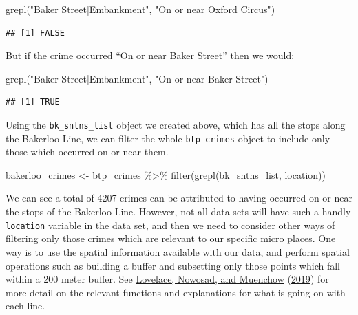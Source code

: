 \documentclass[
  krantz2]{krantz}
\makeatletter
\newenvironment{Shaded}{\begin{snugshade}}{\end{snugshade}}
\newcommand{\FunctionTok}[1]{\textcolor[rgb]{0,0,0}{#1}}
\newcommand{\NormalTok}[1]{#1}
\newcommand{\OtherTok}[1]{\textcolor[rgb]{0.37,0.37,0.37}{#1}}
\newcommand{\SpecialCharTok}[1]{\textcolor[rgb]{0,0,0}{#1}}
\newcommand{\StringTok}[1]{\textcolor[rgb]{0.5,0.5,0.5}{#1}}
\newenvironment{kframe}{%
\medskip{}
\setlength{\fboxsep}{.8em}
 \def\at@end@of@kframe{}%
 \ifinner\ifhmode%
  \def\at@end@of@kframe{\end{minipage}}%
  \begin{minipage}{\columnwidth}%
 \fi\fi%
 \def\FrameCommand##1{\hskip\@totalleftmargin \hskip-\fboxsep
 \colorbox{shadecolor}{##1}\hskip-\fboxsep
     \hskip-\linewidth \hskip-\@totalleftmargin \hskip\columnwidth}%
 \MakeFramed {\advance\hsize-\width
   \@totalleftmargin\z@ \linewidth\hsize
   \@setminipage}}%
 {\par\unskip\endMakeFramed%
 \at@end@of@kframe}
\renewenvironment{Shaded}{\begin{kframe}}{\end{kframe}}
\makeatother
\begin{document}
\begin{Shaded}
\begin{Highlighting}[]
\FunctionTok{grepl}\NormalTok{(}\StringTok{"Baker Street|Embankment"}\NormalTok{, }\StringTok{"On or near Oxford Circus"}\NormalTok{)}
\end{Highlighting}
\end{Shaded}

\begin{verbatim}
## [1] FALSE
\end{verbatim}

But if the crime occurred ``On or near Baker Street'' then we would:

\begin{Shaded}
\begin{Highlighting}[]
\FunctionTok{grepl}\NormalTok{(}\StringTok{"Baker Street|Embankment"}\NormalTok{, }\StringTok{"On or near Baker Street"}\NormalTok{)}
\end{Highlighting}
\end{Shaded}

\begin{verbatim}
## [1] TRUE
\end{verbatim}

Using the \texttt{bk\_sntns\_list} object we created above, which has all the stops along the Bakerloo Line, we can filter the whole \texttt{btp\_crimes} object to include only those which occurred on or near them.

\begin{Shaded}
\begin{Highlighting}[]
\NormalTok{bakerloo\_crimes }\OtherTok{\textless{}{-}}\NormalTok{ btp\_crimes }\SpecialCharTok{\%\textgreater{}\%} 
  \FunctionTok{filter}\NormalTok{(}\FunctionTok{grepl}\NormalTok{(bk\_sntns\_list, location))}
\end{Highlighting}
\end{Shaded}

We can see a total of 4207 crimes can be attributed to having occurred on or near the stops of the Bakerloo Line. However, not all data sets will have such a handly \texttt{location} variable in the data set, and then we need to consider other ways of filtering only those crimes which are relevant to our specific micro places. One way is to use the spatial information available with our data, and perform spatial operations such as building a buffer and subsetting only those points which fall within a 200 meter buffer. See \protect\hyperlink{ref-Lovelace_2019}{Lovelace, Nowosad, and Muenchow} (\protect\hyperlink{ref-Lovelace_2019}{2019}) for more detail on the relevant functions and explanations for what is going on with each line.
\end{document}
